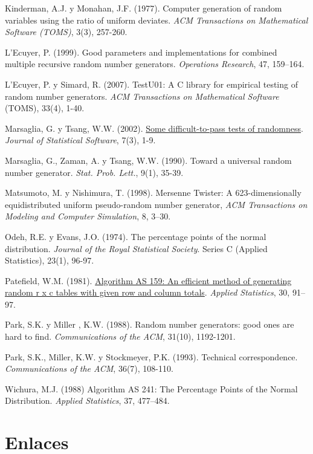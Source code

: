 \documentclass[
]{book}
\theoremstyle{break}
\theoremstyle{nonumberplain}
\begin{document}
Kinderman, A.J. y Monahan, J.F. (1977). Computer generation of random variables using the ratio of uniform deviates. \emph{ACM Transactions on Mathematical Software (TOMS)}, 3(3), 257-260.

L'Ecuyer, P. (1999). Good parameters and implementations for combined multiple recursive random number generators. \emph{Operations Research}, 47, 159--164.

L'Ecuyer, P. y Simard, R. (2007). TestU01: A C library for empirical testing of random number generators. \emph{ACM Transactions on Mathematical Software} (TOMS), 33(4), 1-40.

Marsaglia, G. y Tsang, W.W. (2002). \href{http://www.jstatsoft.org/v07/i03}{Some difficult-to-pass tests of randomness}. \emph{Journal of Statistical Software}, 7(3), 1-9.

Marsaglia, G., Zaman, A. y Tsang, W.W. (1990). Toward a universal random number generator. \emph{Stat. Prob. Lett.}, 9(1), 35-39.

Matsumoto, M. y Nishimura, T. (1998). Mersenne Twister: A 623-dimensionally equidistributed uniform pseudo-random number generator, \emph{ACM Transactions on Modeling and Computer Simulation}, 8, 3--30.

Odeh, R.E. y Evans, J.O. (1974). The percentage points of the normal distribution. \emph{Journal of the Royal Statistical Society}. Series C (Applied Statistics), 23(1), 96-97.

Patefield, W.M. (1981). \href{https://doi.org/10.2307/2346669}{Algorithm AS 159: An efficient method of generating random r x c tables with given row and column totals}. \emph{Applied Statistics}, 30, 91--97.

Park, S.K. y Miller , K.W. (1988). Random number generators: good ones are hard to find. \emph{Communications of the ACM}, 31(10), 1192-1201.

Park, S.K., Miller, K.W. y Stockmeyer, P.K. (1993). Technical correspondence. \emph{Communications of the ACM}, 36(7), 108-110.

Wichura, M.J. (1988) Algorithm AS 241: The Percentage Points of the Normal Distribution. \emph{Applied Statistics}, 37, 477--484.

\hypertarget{appendix-apendices}{%
\appendix}


\hypertarget{links}{%
\chapter{Enlaces}\label{links}}
\end{document}
